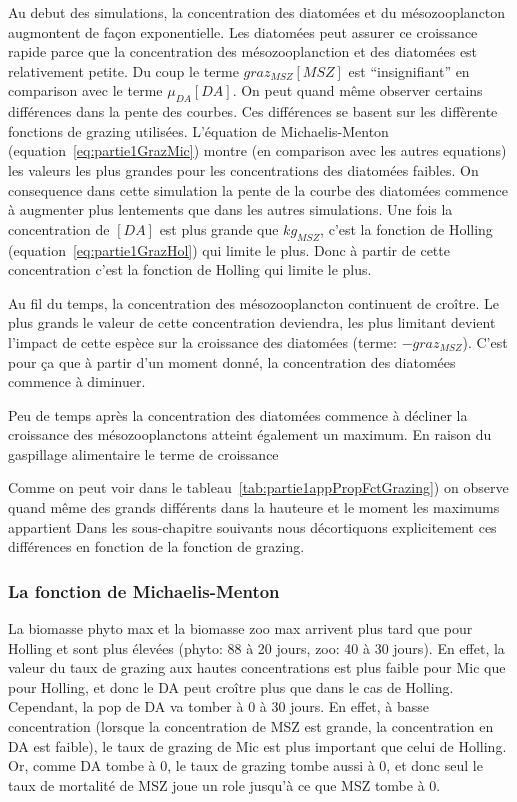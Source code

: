 {\par{
Au debut des simulations, la concentration des diatomées et du mésozooplancton augmontent de
façon exponentielle. Les diatomées peut assurer ce croissance rapide parce que la concentration des
mésozooplanction et des diatomées est relativement petite. Du coup le terme $graz_{MSZ} [MSZ]$ est
``insignifiant'' en comparison avec le terme $\mu_{DA}[DA]$. On peut quand même observer certains
différences dans la pente des courbes. Ces différences se basent sur les diffèrente fonctions de grazing
utilisées. L'équation de Michaelis-Menton (equation~\ref{eq:partie1GrazMic}) montre (en comparison avec
les autres equations) les valeurs les plus grandes pour les concentrations des diatomées faibles.
On consequence dans cette simulation la pente de la courbe des diatomées commence à augmenter plus lentements
que dans les autres simulations. Une fois la concentration de $[DA]$ est plus grande que $kg_{MSZ}$,
c'est la fonction de Holling (equation~\ref{eq:partie1GrazHol}) qui limite le plus. Donc à partir de
cette concentration c'est la fonction de Holling qui limite le plus.
}
\par{
Au fil du temps, la concentration des mésozooplancton continuent de croître. Le plus grands le valeur 
de cette concentration deviendra, les plus limitant devient l'impact de cette espèce sur la croissance
des diatomées (terme: $-graz_{MSZ}$). C'est pour ça que à partir d'un moment donné, la concentration des diatomées commence
à diminuer.
}
\par{
Peu de temps après la concentration des diatomées commence à décliner la croissance des mésozooplanctons
atteint également un maximum. En raison du gaspillage alimentaire le terme de croissance \todo
}
\par{
Comme on peut voir dans le tableau~\ref{tab:partie1appPropFctGrazing}) on observe quand même des
grands différents dans la hauteure et le moment les maximums appartient
Dans les sous-chapitre souivants nous décortiquons explicitement ces différences en fonction de la
fonction de grazing.
}
\subsubsection{La fonction de Michaelis-Menton}
\par{
La biomasse phyto max et la biomasse zoo max arrivent plus tard que pour Holling et sont plus élevées
(phyto: 88 à 20 jours, zoo: 40 à 30 jours). En effet, la valeur du taux de grazing aux hautes
concentrations est plus faible pour Mic que pour Holling, et donc le DA peut croître plus que dans
le cas de Holling. Cependant, la pop de DA va tomber à 0 à 30 jours. En effet, à basse concentration
(lorsque la concentration de MSZ est grande, la concentration en DA est faible), le taux de grazing
de Mic est plus important que celui de Holling. Or, comme DA tombe à 0, le taux de grazing tombe
aussi à 0, et donc seul le taux de mortalité de MSZ joue un role jusqu'à ce que MSZ tombe à 0. 
}
}
